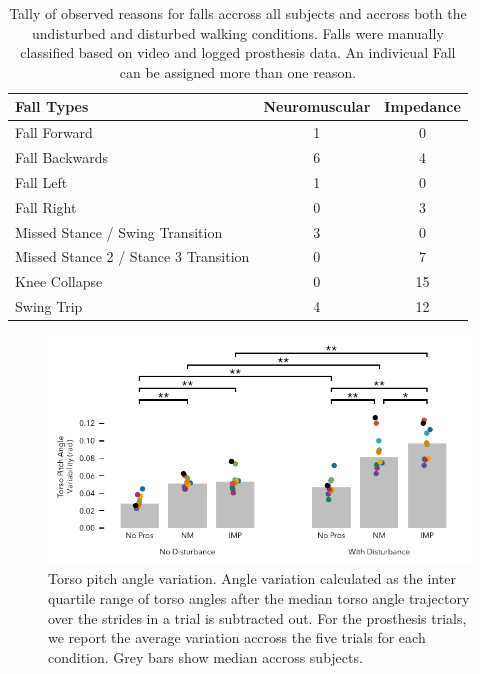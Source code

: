\begin{table}[h]
  \footnotesize%
  \begin{center}
    \begin{tabular}{lcc}
      \toprule
      Fall Types & Neuromuscular & Impedance \\
      \midrule
      Fall Forward &  1 &  0 \\
      Fall Backwards &  6 &  4 \\
      Fall Left &  1 &  0 \\
      Fall Right &  0 &  3 \\
      Missed Stance / Swing Transition &  3 &  0 \\
      Missed Stance 2 / Stance 3 Transition &  0 &  7 \\
      Knee Collapse & 0 & 15 \\
      Swing Trip & 4 & 12 \\
      \bottomrule
    \end{tabular}
  \end{center}
  \caption{Tally of observed reasons for falls accross all subjects and accross
  both the undisturbed and disturbed walking conditions. Falls were manually
  classified based on video and logged prosthesis data. An indivicual Fall can
  be assigned more than one reason.}\label{tab:treadmill_exp_fall_reasons}
\end{table}

\begin{figure}[h]
    \centering 
    \includegraphics[width=\textwidth]{treadmill_vib_torso_var_x}
    \caption{Torso pitch angle variation. Angle variation calculated as the
    inter quartile range of torso angles after the median torso angle trajectory
    over the strides in a trial is subtracted out. For the prosthesis trials, we
    report the average variation accross the five trials for each condition.
    Grey bars show median accross subjects.}\label{fig:treadmill_exp_falls}
\end{figure}

